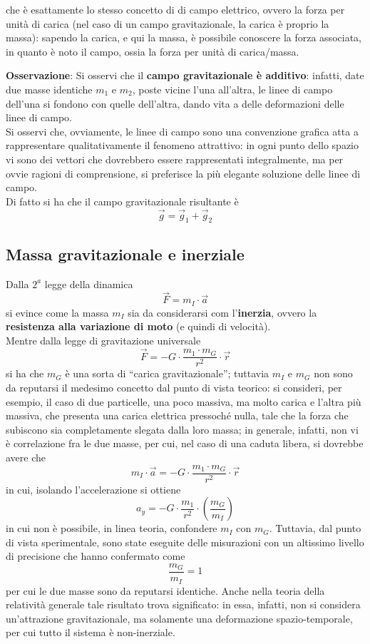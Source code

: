 \documentclass[a4paper]{extarticle}
\newcommand{\quotes}[1]{``#1''}
\begin{document}
\noindent
che è esattamente lo stesso concetto di di campo elettrico, ovvero la forza per unità di carica (nel caso di un campo gravitazionale, la carica è proprio la massa): sapendo la carica, e qui la massa, è possibile conoscere la forza associata, in quanto è noto il campo, ossia la forza per unità di carica/massa.

\vspace{1em}
\noindent
\textbf{Osservazione}: Si osservi che il \textbf{campo gravitazionale è additivo}: infatti, date due masse identiche $m_1$ e $m_2$, poste vicine l'una all'altra, le linee di campo dell'una si fondono con quelle dell'altra, dando vita a delle deformazioni delle linee di campo.\\
Si osservi che, ovviamente, le linee di campo sono una convenzione grafica atta a rappresentare qualitativamente il fenomeno attrattivo: in ogni punto dello spazio vi sono dei vettori che dovrebbero essere rappresentati integralmente, ma per ovvie ragioni di comprensione, si preferisce la più elegante soluzione delle linee di campo.\\
Di fatto si ha che il campo gravitazionale risultante è
\[\vec{g} = \vec{g}_1 + \vec{g}_2\]

\vspace{1em}
\subsection{Massa gravitazionale e inerziale}
Dalla $2^a$ legge della dinamica
\[\vec{F} = m_I \cdot \vec{a}\]
si evince come la massa $m_I$ sia da considerarsi com l'\textbf{inerzia}, ovvero la \textbf{resistenza alla variazione di moto} (e quindi di velocità).\\
Mentre dalla legge di gravitazione universale
\[\vec{F} = - G \cdot \frac{m_1 \cdot m_G}{r^2} \cdot \vec{r}\]
si ha che $m_G$ è una sorta di \quotes{carica gravitazionale}; tuttavia $m_I$ e $m_G$ non sono da reputarsi il medesimo concetto dal punto di vista teorico: si consideri, per esempio, il caso di due particelle, una poco massiva, ma molto carica e l'altra più massiva, che presenta una carica elettrica pressoché nulla, tale che la forza che subiscono sia completamente slegata dalla loro massa; in generale, infatti, non vi è correlazione fra le due masse, per cui, nel caso di una caduta libera, si dovrebbe avere che
\[m_I \cdot \vec{a} = - G \cdot \frac{m_1 \cdot m_G}{r^2} \cdot \vec{r}\]
in cui, isolando l'accelerazione si ottiene
\[a_y = -G \cdot \frac{m_1}{r^2} \cdot \left(\frac{m_G}{m_I}\right)\]
in cui non è possibile, in linea teoria, confondere $m_I$ con $m_G$. Tuttavia, dal punto di vista sperimentale, sono state eseguite delle misurazioni con un altissimo livello di precisione che hanno confermato come
\[\frac{m_G}{m_I} = 1\]
per cui le due masse sono da reputarsi identiche. Anche nella teoria della relatività generale tale risultato trova significato: in essa, infatti, non si considera un'attrazione gravitazionale, ma solamente una deformazione spazio-temporale, per cui tutto il sistema è non-inerziale.
\end{document}
